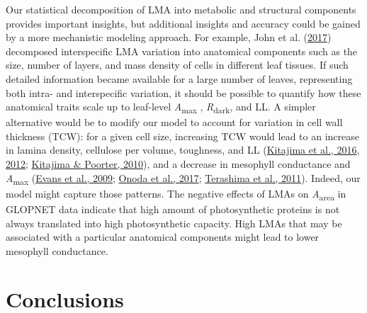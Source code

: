\documentclass[
  12pt,
  a4paper,
,tablecaptionabove
]{scrartcl}
\begin{document}
Our statistical decomposition of LMA into metabolic and structural
components provides important insights, but additional insights and
accuracy could be gained by a more mechanistic modeling approach. For
example, John et al. (\protect\hyperlink{ref-John2017}{2017}) decomposed
interspecific LMA variation into anatomical components such as the size,
number of layers, and mass density of cells in different leaf tissues.
If such detailed information became available for a large number of
leaves, representing both intra- and interspecific variation, it should
be possible to quantify how these anatomical traits scale up to
leaf-level \emph{A}\textsubscript{max} , \emph{R}\textsubscript{dark},
and LL. A simpler alternative would be to modify our model to account
for variation in cell wall thickness (TCW): for a given cell size,
increasing TCW would lead to an increase in lamina density, cellulose
per volume, toughness, and LL
(\protect\hyperlink{ref-Kitajima2016}{Kitajima et al., 2016},
\protect\hyperlink{ref-Kitajima2012}{2012};
\protect\hyperlink{ref-Kitajima2010}{Kitajima \& Poorter, 2010}), and a
decrease in mesophyll conductance and \emph{A}\textsubscript{max}
(\protect\hyperlink{ref-Evans2009}{Evans et al., 2009};
\protect\hyperlink{ref-Onoda2017}{Onoda et al., 2017};
\protect\hyperlink{ref-Terashima2011}{Terashima et al., 2011}). Indeed,
our model might capture those patterns. The negative effects of LMAs on
\emph{A}\textsubscript{area} in GLOPNET data indicate that high amount
of photosynthetic proteins is not always translated into high
photosynthetic capacity. High LMAs that may be associated with a
particular anatomical components might lead to lower mesophyll
conductance.

\hypertarget{conclusions}{%
\section{Conclusions}\label{conclusions}}
\end{document}

